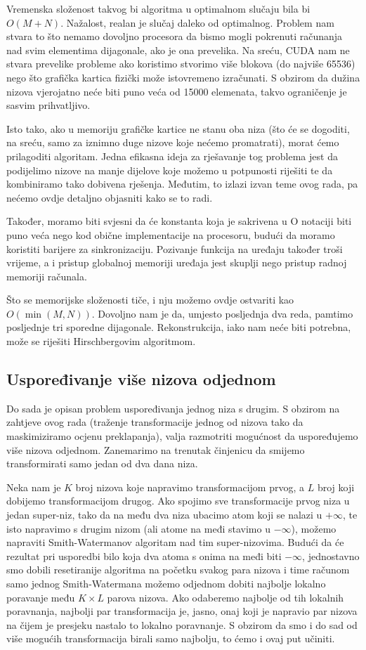 \documentclass[times, utf8, zavrsni]{fer}
\begin{document}
Vremenska složenost takvog bi algoritma u optimalnom slučaju bila
bi $O(M+N)$. Nažalost, realan je slučaj daleko od optimalnog. 
Problem nam stvara to što nemamo dovoljno procesora da bismo
mogli pokrenuti računanja nad svim elementima dijagonale, ako je
ona prevelika. Na sreću, CUDA nam ne stvara prevelike probleme
ako koristimo stvorimo više blokova (do najviše 65536) nego što
grafička kartica fizički može istovremeno izračunati. S obzirom
da dužina nizova vjerojatno neće biti puno veća od 15000 elemenata, 
takvo ograničenje je sasvim prihvatljivo.

Isto tako, ako u memoriju grafičke kartice ne stanu
oba niza (što će se dogoditi, na sreću, samo za iznimno
duge nizove koje nećemo promatrati), morat ćemo prilagoditi
algoritam. Jedna efikasna ideja
za rješavanje tog problema jest da podijelimo nizove na manje
dijelove koje možemo u potpunosti riješiti te da kombiniramo
tako dobivena rješenja. 
Međutim, to izlazi izvan teme ovog rada, pa nećemo
ovdje detaljno objasniti kako se to radi.

Također, moramo biti svjesni da će konstanta koja je sakrivena u O
notaciji biti puno veća nego kod obične implementacije na procesoru,
budući da moramo koristiti barijere za sinkronizaciju. Pozivanje
funkcija na uređaju također troši vrijeme, a i pristup globalnoj
memoriji uređaja jest skuplji nego pristup radnoj memoriji računala. 

Što se memorijske složenosti tiče, i nju možemo ovdje ostvariti
kao $O(\min(M,N))$. Dovoljno nam je da, umjesto posljednja dva reda,
pamtimo posljednje tri sporedne dijagonale. Rekonstrukcija, iako
nam neće biti potrebna, može se riješiti Hirschbergovim algoritmom. 

\subsection{Uspoređivanje više nizova odjednom}
Do sada je opisan problem uspoređivanja jednog niza s drugim. S obzirom
na zahtjeve ovog rada (traženje transformacije jednog od nizova tako
da maskimiziramo ocjenu preklapanja), valja razmotriti mogućnost da 
uspoređujemo više nizova odjednom. Zanemarimo na trenutak činjenicu
da smijemo transformirati samo jedan od dva dana niza. 

Neka nam je $K$ broj nizova koje napravimo transformacijom prvog, a
$L$ broj koji dobijemo transformacijom drugog. Ako spojimo sve
transformacije prvog niza u jedan super-niz, tako da na među 
dva niza ubacimo atom koji se nalazi u $+\infty$, te isto
napravimo s drugim nizom (ali atome na međi stavimo u $-\infty$),
možemo napraviti Smith-Watermanov algoritam nad tim super-nizovima.
Budući da će rezultat pri usporedbi bilo koja dva atoma s
onima na međi biti $-\infty$, jednostavno smo dobili resetiranije
algoritma na početku svakog para nizova i time računom samo jednog
Smith-Watermana možemo odjednom dobiti najbolje lokalno
poravanje među $K \times L$ parova nizova. Ako odaberemo najbolje
od tih lokalnih poravnanja, najbolji par transformacija je, jasno,
onaj koji je napravio par nizova na čijem je presjeku nastalo
to lokalno poravnanje.
S obzirom da smo i do sad od više mogućih transformacija birali samo
najbolju, to ćemo i ovaj put učiniti. 
\end{document}
